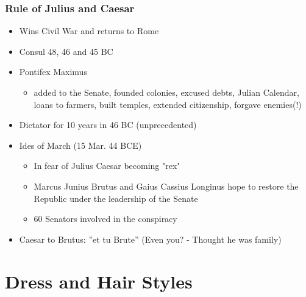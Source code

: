 \documentclass[12pt, twoside]{article}
\begin{document}
\subsubsection{Rule of Julius and Caesar}
\begin{itemize}
\item Wins Civil War and returns to Rome
\item Consul 48, 46 and 45 BC
\item Pontifex Maximus
	\begin{itemize}
	\item added to the Senate, founded colonies, excused debts, Julian Calendar, loans to farmers, built temples, extended citizenship, forgave enemies(!)
	\end{itemize}
\item Dictator for 10 years in 46 BC (unprecedented)
\item Ides of March (15 Mar. 44 BCE)
	\begin{itemize}
	\item In fear of Julius Caesar becoming "rex"
	\item Marcus Junius Brutus and Gaius Cassius Longinus hope to restore the Republic under the leadership of the Senate
	\item 60 Senators involved in the conspiracy
	\end{itemize}
\item Caesar to Brutus: ”et tu Brute” (Even you? - Thought he was family)
\end{itemize}

\section{Dress and Hair Styles}
\end{document}

